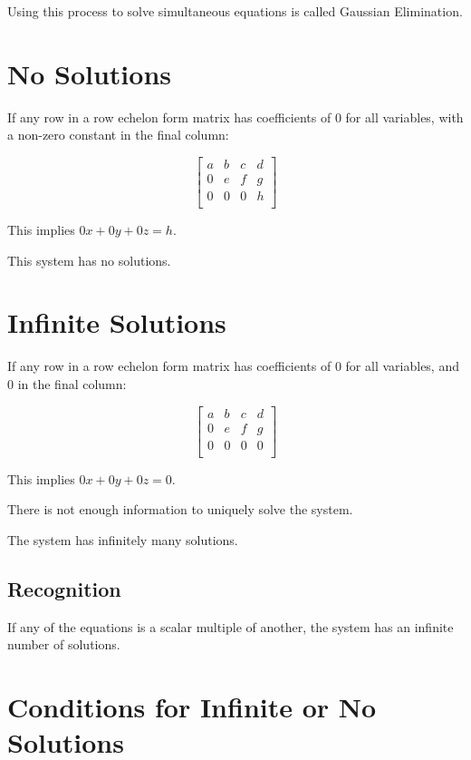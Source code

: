 \documentclass[a4paper,11pt]{article}
\begin{document}
Using this process to solve simultaneous equations is called Gaussian
Elimination.



\section{No Solutions}

If any row in a row echelon form matrix has coefficients of 0 for all variables,
with a non-zero constant in the final column:

$$
\begin{bmatrix}
a & b & c & d \\
0 & e & f & g \\
0 & 0 & 0 & h \\
\end{bmatrix}
$$

This implies $0x + 0y + 0z = h$.

This system has no solutions.




\section{Infinite Solutions}

If any row in a row echelon form matrix has coefficients of 0 for all variables,
and 0 in the final column:

$$
\begin{bmatrix}
a & b & c & d \\
0 & e & f & g \\
0 & 0 & 0 & 0 \\
\end{bmatrix}
$$

This implies $0x + 0y + 0z = 0$.

There is not enough information to uniquely solve the system.

The system has infinitely many solutions.


\subsection{Recognition}

If any of the equations is a scalar multiple of another, the system has an
infinite number of solutions.




\section{Conditions for Infinite or No Solutions}
\end{document}
